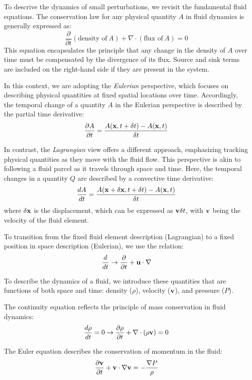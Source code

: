 To descrive the dynamics of small perturbations, we revisit the fundamental fluid equations. 
%
The conservation law for any physical quantity \(A\) in fluid dynamics is generally expressed as:
%
\[
\frac{\partial}{\partial t} (\text{density of}~A) + \nabla \cdot (\text{flux of}~A) = 0
\]
%
This equation encapsulates the principle that any change in the density of \(A\) over time must be compensated by the divergence of its flux. Source and sink terms are included on the right-hand side if they are present in the system.

In this context, we are adopting the \emph{Eulerian} perspective, which focuses on describing physical quantities at fixed spatial locations  over time. 
%
Accordingly, the temporal change of a quantity \(A\) in the Eulerian perspective is described by the partial time derivative:
%
\[
\frac{\partial A}{\partial t} = \frac{A(\vb x, t +\delta t) - A(\vb x, t)}{\delta t} 
\]

In contrast, the \emph{Lagrangian} view offers a different approach, emphasizing tracking physical quantities as they move with the fluid flow. This perspective is akin to following a fluid parcel as it travels through space and time. Here, the temporal changes in a quantity \(Q\) are described by a convective time derivative:
%
\[
\frac{d A}{dt} = \frac{A(\vb x + \delta \vb x, t + \delta t) - A(\vb x, t)}{\delta t} 
\]
%
where \( \delta \vb x \) is the displacement, which can be expressed as \( \vb v \delta t \), with \( \vb v \) being the velocity of the fluid element.

To transition from the fixed fluid element description (Lagrangian) to a fixed position in space description (Eulerian), we use the relation:
%
\begin{equation}
\frac{d}{dt} \rightarrow \frac{\partial}{\partial t} + \vb u \cdot \nabla
\end{equation}

To describe the dynamics of a fluid, we introduce these quantities that are functions of both space and time: density (\( \rho \)), velocity (\( \vb v \)), and pressure (\( P \)).

The continuity equation reflects the principle of mass conservation in fluid dynamics:
%
\begin{equation}
\frac{d\rho}{dt}  = 0 \rightarrow \frac{\partial \rho}{\partial t} + \nabla \cdot (\rho \vb v) = 0
\end{equation}

The Euler equation describes the conservation of momentum in the fluid:
%
\begin{equation}
\frac{\partial \vb v}{\partial t} + \vb v \cdot \nabla \vb v = - \frac{\nabla P}{\rho}
\end{equation}

